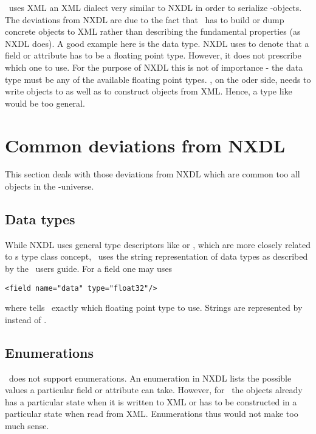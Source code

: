
\libpniio\ uses XML an XML dialect very similar to NXDL in order to serialize
\nexus-objects. The deviations from NXDL are due to the fact that \libpniio\ has
to build or dump concrete objects to XML rather than describing the fundamental
properties (as NXDL does). 
A good example here is the data type. NXDL uses  to denote that a
field or attribute has to be a floating point type. However, it does not
prescribe which one to use. For the purpose of NXDL this is not of importance -
the data type must be any of the available floating point types. 
\libpniio, on the oder side, needs to write objects to as well as to construct
objects from XML. Hence, a type like  would be too general. 

\section{Common deviations from NXDL}

This section deals with those deviations from NXDL which are common too all
objects in the \nexus-universe. 

\subsection{Data types} 

While NXDL uses general type descriptors like  or  
, which are more closely related to \libpnicore s type class concept, \libpniio\ 
uses the string representation of data types as described by the \libpnicore\
users guide. For a field one may uses 
\begin{verbatim}
<field name="data" type="float32"/>
\end{verbatim}
where  tells \libpniio\ exactly which floating point type to use.
Strings are represented by  instead of .

\subsection{Enumerations}

\libpniio\ does not support enumerations. An enumeration in NXDL lists the 
possible values a particular field or attribute can take. However, for
\libpniio\ the objects already has a particular state when it is written to XML
or has to be constructed in a particular state when read from XML. 
Enumerations thus would not make too much sense.

